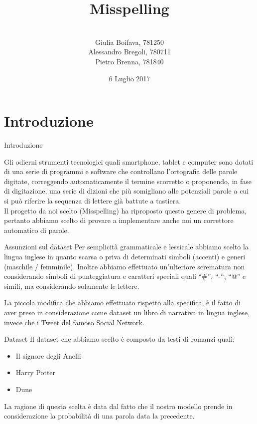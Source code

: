 \documentclass{beamer}
\title{Misspelling}
\author[Boifava, Bregoli, Brenna]{ \\ Giulia Boifava, 781250 \\ Alessandro Bregoli, 780711 \\ Pietro Brenna, 781840}
\date{6 Luglio 2017}
\begin{document}
\begin{frame}
  \titlepage
\end{frame}

\section{Introduzione}

\begin{frame}{Introduzione}


    Gli odierni strumenti tecnologici quali smartphone, tablet e computer sono dotati di una serie di programmi e software che controllano
    l’ortografia delle parole digitate, correggendo automaticamente il termine scorretto o proponendo, in fase di digitazione, una serie di
    dizioni che più somigliano alle potenziali parole a cui si può riferire la sequenza di lettere già battute a tastiera.\\
    Il progetto da noi scelto (Misspelling) ha riproposto questo genere di problema, pertanto abbiamo scelto di provare a implementare 
    anche noi un correttore automatico di parole.

\end{frame}

\begin{frame}{Assunzioni sul dataset}
Per semplicità grammaticale e lessicale abbiamo scelto la lingua inglese in quanto scarsa o priva di determinati simboli (accenti) e generi (maschile / 
femminile).
Inoltre abbiamo effettuato un’ulteriore scrematura non considerando simboli di punteggiatura e caratteri speciali quali “\#”, “-“, “@” e simili, ma 
considerando solamente le lettere.

La piccola modifica che abbiamo effettuato rispetto alla specifica, è il fatto di aver preso in considerazione come dataset un libro di narrativa in 
lingua inglese, invece che i Tweet del famoso Social Network.
\end{frame}

\begin{frame}{Dataset}
Il dataset che abbiamo scelto è composto da testi di romanzi quali:
\begin{itemize}
 \item Il signore degli Anelli
 \item Harry Potter
 \item Dune
\end{itemize}
La ragione di questa scelta è data dal fatto che il nostro modello prende in considerazione
la probabilità di una parola data la precedente.
\end{frame}
\end{document}
